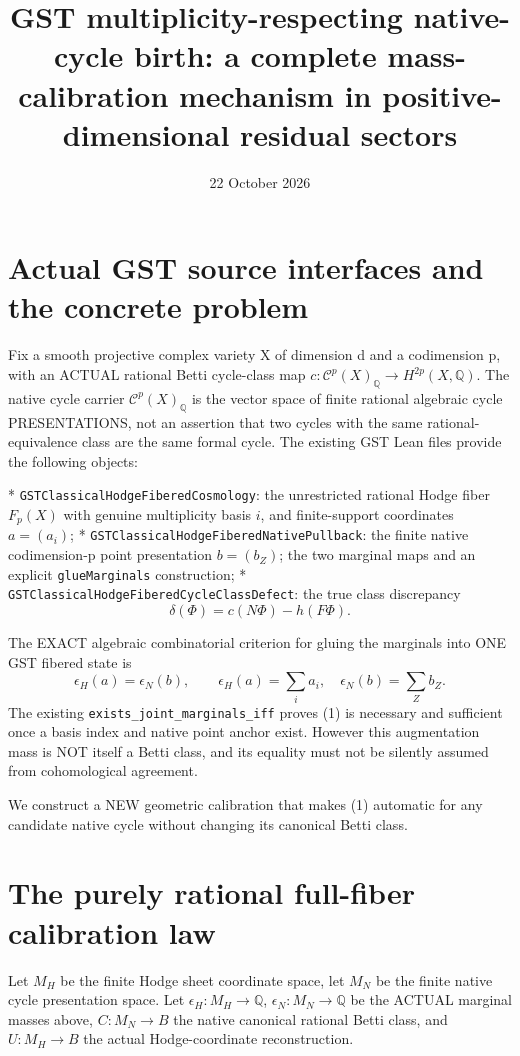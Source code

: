 \documentclass[11pt]{article}
\title{GST multiplicity-respecting native-cycle birth:
a complete mass-calibration mechanism in positive-dimensional residual sectors}
\date{22 October 2026}
\newcommand{\Q}{\mathbb Q}
\begin{document}
\maketitle

\section{Actual GST source interfaces and the concrete problem}
Fix a smooth projective complex variety X of dimension d and a
codimension p, with an ACTUAL rational Betti cycle-class map
\(c:\mathcal C^p(X)_\Q\to H^{2p}(X,\Q)\).
The native cycle carrier \(\mathcal C^p(X)_\Q\) is the vector space
of finite rational algebraic cycle PRESENTATIONS, not an
assertion that two cycles with the same rational-equivalence
class are the same formal cycle. The existing GST Lean files
provide the following objects:

* \texttt{GSTClassicalHodgeFiberedCosmology}: the unrestricted
rational Hodge fiber \(F_p(X)\) with genuine multiplicity
basis \(i\), and finite-support coordinates \(a=(a_i)\);
* \texttt{GSTClassicalHodgeFiberedNativePullback}: the finite
native codimension-p point presentation \(b=(b_Z)\);
the two marginal maps and an explicit \texttt{glueMarginals}
construction;
* \texttt{GSTClassicalHodgeFiberedCycleClassDefect}:
the true class discrepancy
\[
 \delta(\Phi)=c(N\Phi)-h(F\Phi).
\]

The EXACT algebraic combinatorial criterion for gluing
the marginals into ONE GST fibered state is
\[
 \boxed{\epsilon_H(a)=\epsilon_N(b)},\qquad
 \epsilon_H(a)=\sum_i a_i,\quad
 \epsilon_N(b)=\sum_Z b_Z.                         \tag{1}
\]
The existing \texttt{exists_joint_marginals_iff}
proves (1) is necessary and sufficient once a basis
index and native point anchor exist. However this
augmentation mass is NOT itself a Betti class, and
its equality must not be silently assumed from
cohomological agreement.

We construct a NEW geometric calibration that
makes (1) automatic for any candidate native cycle
without changing its canonical Betti class.

\section{The purely rational full-fiber calibration law}
Let \(M_H\) be the finite Hodge sheet coordinate space,
let \(M_N\) be the finite native cycle presentation space.
Let \(\epsilon_H:M_H\to\Q\), \(\epsilon_N:M_N\to\Q\)
be the ACTUAL marginal masses above, \(C:M_N\to B\)
the native canonical rational Betti class, and
\(U:M_H\to B\) the actual Hodge-coordinate reconstruction.
\end{document}

